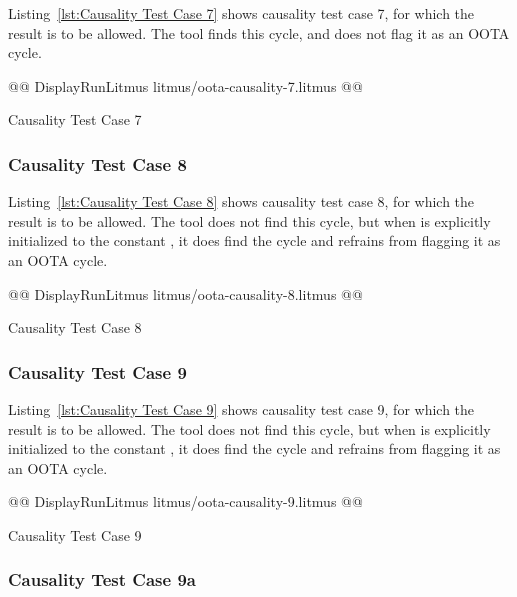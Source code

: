 \documentclass[10]{article}
\begin{document}
Listing~\ref{lst:Causality Test Case 7}
shows causality test case 7, for which the 
result is to be allowed.
The  tool finds this cycle, and does not flag it as an OOTA cycle.

\begin{listing}[tbp]
@@ DisplayRunLitmus litmus/oota-causality-7.litmus @@
\caption{Causality Test Case 7}
\label{lst:Causality Test Case 7}
\end{listing}

\subsubsection{Causality Test Case 8}
\label{app:Causality Test Case 8}

Listing~\ref{lst:Causality Test Case 8}
shows causality test case 8, for which the 
result is to be allowed.
The  tool does not find this cycle, but when  is explicitly
initialized to the constant , it does find the cycle and refrains
from flagging it as an OOTA cycle.

\begin{listing}[tbp]
@@ DisplayRunLitmus litmus/oota-causality-8.litmus @@
\caption{Causality Test Case 8}
\label{lst:Causality Test Case 8}
\end{listing}

\subsubsection{Causality Test Case 9}
\label{app:Causality Test Case 9}

Listing~\ref{lst:Causality Test Case 9}
shows causality test case 9, for which the 
result is to be allowed.
The  tool does not find this cycle, but when  is explicitly
initialized to the constant , it does find the cycle and refrains
from flagging it as an OOTA cycle.

\begin{listing}[tbp]
@@ DisplayRunLitmus litmus/oota-causality-9.litmus @@
\caption{Causality Test Case 9}
\label{lst:Causality Test Case 9}
\end{listing}

\subsubsection{Causality Test Case 9a}
\label{app:Causality Test Case 9a}
\end{document}
